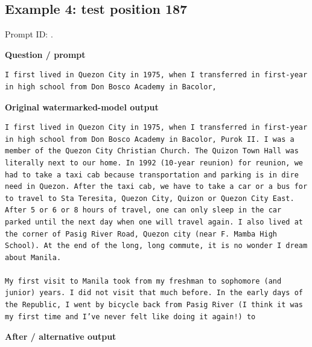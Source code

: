 \subsection{Example 4: test position
187}\label{record-docs-watermarking-qualitative-paper-kgw-vanilla-md-example-4-test-position-187}

Prompt ID:
\texttt{}.

\textbf{Question / prompt}

\begin{Verbatim}
I first lived in Quezon City in 1975, when I transferred in first-year in high school from Don Bosco Academy in Bacolor,
\end{Verbatim}

\textbf{Original watermarked-model output}

\begin{Verbatim}
I first lived in Quezon City in 1975, when I transferred in first-year in high school from Don Bosco Academy in Bacolor, Purok II. I was a member of the Quezon City Christian Church. The Quizon Town Hall was literally next to our home. In 1992 (10-year reunion) for reunion, we had to take a taxi cab because transportation and parking is in dire need in Quezon. After the taxi cab, we have to take a car or a bus for to travel to Sta Teresita, Quezon City, Quizon or Quezon City East. After 5 or 6 or 8 hours of travel, one can only sleep in the car parked until the next day when one will travel again. I also lived at the corner of Pasig River Road, Quezon city (near F. Mamba High School). At the end of the long, long commute, it is no wonder I dream about Manila.

My first visit to Manila took from my freshman to sophomore (and junior) years. I did not visit that much before. In the early days of the Republic, I went by bicycle back from Pasig River (I think it was my first time and I’ve never felt like doing it again!) to
\end{Verbatim}

\textbf{After / alternative output}

